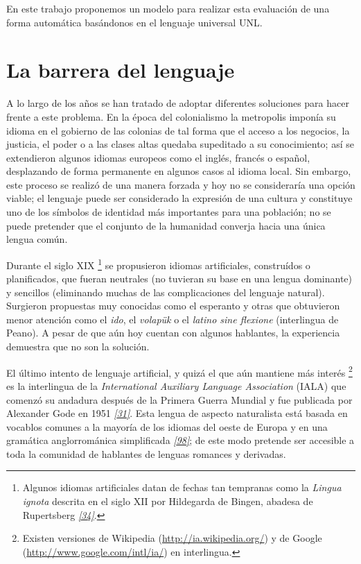 \documentclass[a4paper,12pt,spanish]{book}
\begin{document}
En este trabajo proponemos un modelo para realizar esta evaluación de una forma
automática basándonos en el lenguaje universal UNL.


\section{La barrera del lenguaje}
\label{0.intro:la-barrera-del-lenguaje}
A lo largo de los años se han tratado de adoptar diferentes soluciones para hacer
frente a este problema. En la época del colonialismo la metropolis imponía su idioma
en el gobierno de las colonias de tal forma que el acceso a los negocios, la
justicia, el poder o a las clases altas quedaba supeditado a su conocimiento;
así se extendieron algunos idiomas europeos como el inglés, francés o español,
desplazando de forma permanente en algunos casos al idioma local. Sin embargo, este
proceso se realizó de una manera forzada y hoy no se consideraría una opción viable; el
lenguaje puede ser considerado la expresión de una cultura y constituye uno de los
símbolos de identidad más importantes para una población; no se puede pretender que
el conjunto de la humanidad converja hacia una única lengua común.

Durante el siglo XIX \footnote{
Algunos idiomas artificiales datan de fechas tan tempranas como la \emph{Lingua ignota}
descrita en el siglo XII por Hildegarda de Bingen, abadesa de Rupertsberg \label{0.intro:id7}{\hyperref[zreferences:lang2008]{\emph{{[}34{]}}}}.
} se propusieron idiomas artificiales, construídos o planificados,
que fueran neutrales (no tuvieran su base en una lengua dominante) y sencillos (eliminando
muchas de las complicaciones del lenguaje natural). Surgieron propuestas muy conocidas
como el esperanto y otras que obtuvieron menor atención como el \emph{ido}, el
\emph{volapük} o el \emph{latino sine flexione} (interlingua de Peano). A pesar de que aún hoy
cuentan con algunos hablantes, la experiencia demuestra que no son la solución.

El último intento de lenguaje artificial, y quizá el que aún mantiene más interés \footnote{
Existen versiones de Wikipedia (\href{http://ia.wikipedia.org/}{http://ia.wikipedia.org/}) y de
Google (\href{http://www.google.com/intl/ia/}{http://www.google.com/intl/ia/}) en interlingua.
} es
la interlingua de la \emph{International Auxiliary Language Association} (IALA) que comenzó
su andadura después de la Primera Guerra Mundial y fue publicada por Alexander Gode
en 1951 \label{0.intro:id9}{\hyperref[zreferences:gode1955]{\emph{{[}31{]}}}}. Esta lengua de aspecto naturalista está basada en vocablos
comunes a la mayoría de los idiomas del oeste de Europa y en una gramática anglorrománica
simplificada \label{0.intro:id10}{\hyperref[zreferences:wp-interlingua]{\emph{{[}98{]}}}}; de este modo pretende ser accesible a toda la comunidad
de hablantes de lenguas romances y derivadas.
\end{document}
